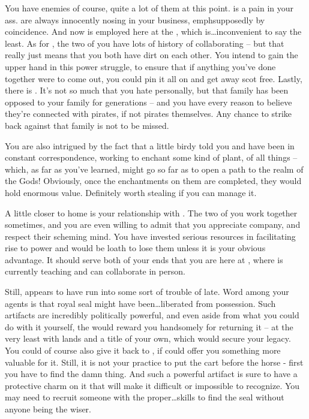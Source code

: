 \documentclass[char]{GL2020}
\begin{document}
You have enemies of course, quite a lot of them at this point. \cInterpol{} is a pain in your ass. \cInterpol{\They} are always innocently nosing in your business, emph{supposedly} by coincidence. And now \cInterpol{} is employed here at the \pSc{}, which is\ldots inconvenient to say the least. As for \cDiplomat{}, the two of you have lots of history of collaborating -- but that really just means that you both have dirt on each other. You intend to gain the upper hand in this power struggle, to ensure that if anything you’ve done together were to come out, you could pin it all on \cDiplomat{} and get away scot free. Lastly, there is \cJuniorStatesman{}. It’s not so much that you hate \cJuniorStatesman{} personally, but that \cJuniorStatesman{\their} family has been opposed to your family for generations -- and you have every reason to believe they’re connected with pirates, if not pirates themselves. Any chance to strike back against that family is not to be missed.

You are also intrigued by the fact that a little birdy told you \cCurse{} and \cFlowPriest{} have been in constant correspondence, working to enchant some kind of plant, of all things -- which, as far as you’ve learned, might go so far as to open a path to the realm of the Gods!  Obviously, once the enchantments on them are completed, they would hold enormous value. Definitely worth stealing if you can manage it.

A little closer to home is your relationship with \cPrince{}. The two of you work together sometimes, and you are even willing to admit that you appreciate \cPrince{\their} company, and respect their scheming mind. You have invested serious resources in facilitating \cPrince{\their} rise to power and would be loath to lose them unless it is your obvious advantage. It should serve both of your ends that you are here at \pSchool{}, where \cPrince{} is currently teaching and can collaborate in person. 

Still, \cPrince{} appears to have run into some sort of trouble of late. Word among your agents is that \cPrince{\their} royal seal might have been\ldots liberated from \cPrince{\their} possession. Such artifacts are incredibly politically powerful, and even aside from what you could do with it yourself, the \cQueen{\Majesty} would reward you handsomely for returning it -- at the very least with lands and a title of your own, which would secure your legacy. You could of course also give it back to \cPrince{}, if \cPrince{\they} could offer you something more valuable for it. Still, it is not your practice to put the cart before the horse - first you have to find the damn thing. And such a powerful artifact is sure to have a protective charm on it that will make it difficult or impossible to recognize. You may need to recruit someone with the proper\ldots skills to find the seal without anyone being the wiser.
\end{document}
